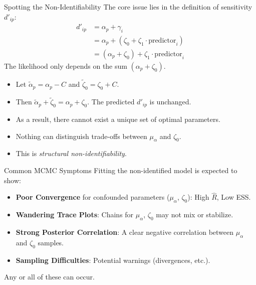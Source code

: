 \documentclass[aspectratio=169]{beamer}
\begin{document}
\begin{frame}{Spotting the Non-Identifiability}
  The core issue lies in the definition of sensitivity $d'_{ip}$:
  \begin{align*}
    d'_{ip} &= \alpha_p + \gamma_i \\
           &= \alpha_p + (\zeta_0 + \zeta_1 \cdot \text{predictor}_i) \\
           &= (\alpha_p + \zeta_0) + \zeta_1 \cdot \text{predictor}_i \label{eq:nonid}
  \end{align*} \pause
  The likelihood only depends on the sum $(\alpha_p + \zeta_0)$. \pause
  \begin{itemize}
      \item Let $\tilde{\alpha}_p = \alpha_p - C$ and $\tilde{\zeta}_0 = \zeta_0 + C$.
      \item Then $\tilde{\alpha}_p + \tilde{\zeta}_0 = \alpha_p + \zeta_0$. The predicted $d'_{ip}$ is unchanged. \pause
      \item As a result, there cannot exist a unique set of optimal parameters. \pause
      \item Nothing can distinguish trade-offs between $\mu_\alpha$ and $\zeta_0$. \pause
      \item This is \emph{structural non-identifiability}.
  \end{itemize}
\end{frame}

\begin{frame}{Common MCMC Symptoms}
  Fitting the non-identified model is expected to show: \pause
    \begin{itemize}[label=--, itemsep=1ex]
        \item \textbf{Poor Convergence} for confounded parameters ($\mu_\alpha$, $\zeta_0$): High $\hat{R}$, Low ESS. \pause
        \item \textbf{Wandering Trace Plots}: Chains for $\mu_\alpha$, $\zeta_0$ may not mix or stabilize. \pause
        \item \textbf{Strong Posterior Correlation}: A clear negative correlation between $\mu_\alpha$ and $\zeta_0$ samples. \pause
        \item \textbf{Sampling Difficulties}: Potential warnings (divergences, etc.).
    \end{itemize}
    Any or all of these can occur.
\end{frame}
\end{document}
